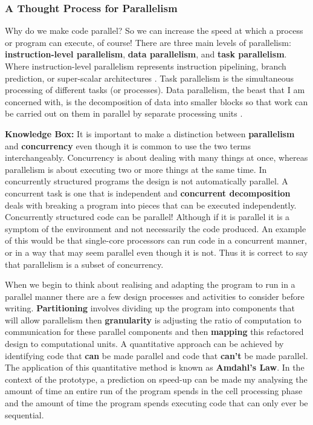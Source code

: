 \documentclass[11pt]{article} %
\begin{document}
\subsubsection{A Thought Process for Parallelism}
Why do we make code parallel? So we can increase the speed at which a process or program can execute, of course! There are three main levels of parallelism: {\bf instruction-level parallelism}, {\bf data parallelism}, and {\bf task parallelism}. Where instruction-level parallelism represents instruction pipelining, branch prediction, or super-scalar architectures \cite[Patterson, Hennessy, p41]{ref10}. Task parallelism is the simultaneous processing of different tasks (or processes). Data parallelism, the beast that I am concerned with, is the decomposition of data into smaller blocks so that work can be carried out on them in parallel by separate processing units \cite[Patterson, Hennessy, A-17]{ref10}.
\bigskip
\begin{mdframed}
{\bf Knowledge Box:} It is important to make a distinction between {\bf parallelism} and {\bf concurrency} even though it is common to use the two terms interchangeably. Concurrency is about dealing with many things at once, whereas parallelism is about executing two or more things at the same time. In concurrently structured programs the design is not automatically parallel. A concurrent task is one that is independent and {\bf concurrent decomposition} deals with breaking a program into pieces that can be executed independently.  Concurrently structured code can be parallel! Although if it is parallel it is a symptom of the environment and not necessarily the code produced. An example of this would be that single-core processors can run code in a concurrent manner, or in a way that may seem parallel even though it is not. \cite{ref12} Thus it is correct to say that parallelism is a subset of concurrency. 
\end{mdframed}
\bigskip
When we begin to think about realising and adapting the program to run in a parallel manner there are a few design processes and activities to consider before writing. {\bf Partitioning} involves dividing up the program into components that will allow parallelism then {\bf granularity} is adjusting the ratio of computation to communication for these parallel components and then {\bf mapping} this refactored design to computational units. \cite[p77,78]{ref9} A quantitative approach can be achieved by identifying code that {\bf can} be made parallel and code that {\bf can't} be made parallel. The application of this quantitative method is known as {\bf Amdahl's Law}. In the context of the prototype, a prediction on speed-up can be made my analysing the amount of time an entire run of the program spends in the cell processing phase and the amount of time the program spends executing code that can only ever be sequential.
\end{document}
